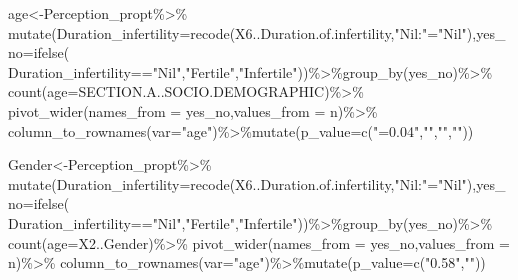 \documentclass[
]{article}
\newenvironment{Shaded}{\begin{snugshade}}{\end{snugshade}}
\newcommand{\AttributeTok}[1]{\textcolor[rgb]{0.77,0.63,0.00}{#1}}
\newcommand{\FunctionTok}[1]{\textcolor[rgb]{0.00,0.00,0.00}{#1}}
\newcommand{\NormalTok}[1]{#1}
\newcommand{\OtherTok}[1]{\textcolor[rgb]{0.56,0.35,0.01}{#1}}
\newcommand{\SpecialCharTok}[1]{\textcolor[rgb]{0.00,0.00,0.00}{#1}}
\newcommand{\StringTok}[1]{\textcolor[rgb]{0.31,0.60,0.02}{#1}}
\begin{document}
\begin{Shaded}
\begin{Highlighting}[]
\NormalTok{age}\OtherTok{\textless{}{-}}\NormalTok{Perception\_propt}\SpecialCharTok{\%\textgreater{}\%}
  \FunctionTok{mutate}\NormalTok{(}\AttributeTok{Duration\_infertility=}\FunctionTok{recode}\NormalTok{(X6..Duration.of.infertility,}\StringTok{"Nil:"}\OtherTok{=}\StringTok{"Nil"}\NormalTok{),}\AttributeTok{yes\_no=}\FunctionTok{ifelse}\NormalTok{(}
\NormalTok{   Duration\_infertility}\SpecialCharTok{==}\StringTok{"Nil"}\NormalTok{,}\StringTok{"Fertile"}\NormalTok{,}\StringTok{"Infertile"}\NormalTok{))}\SpecialCharTok{\%\textgreater{}\%}\FunctionTok{group\_by}\NormalTok{(yes\_no)}\SpecialCharTok{\%\textgreater{}\%}
  \FunctionTok{count}\NormalTok{(}\AttributeTok{age=}\NormalTok{SECTION.A..SOCIO.DEMOGRAPHIC)}\SpecialCharTok{\%\textgreater{}\%}
  \FunctionTok{pivot\_wider}\NormalTok{(}\AttributeTok{names\_from =}\NormalTok{ yes\_no,}\AttributeTok{values\_from =}\NormalTok{ n)}\SpecialCharTok{\%\textgreater{}\%}
  \FunctionTok{column\_to\_rownames}\NormalTok{(}\AttributeTok{var=}\StringTok{"age"}\NormalTok{)}\SpecialCharTok{\%\textgreater{}\%}\FunctionTok{mutate}\NormalTok{(}\AttributeTok{p\_value=}\FunctionTok{c}\NormalTok{(}\StringTok{"=0.04"}\NormalTok{,}\StringTok{""}\NormalTok{,}\StringTok{""}\NormalTok{,}\StringTok{""}\NormalTok{))}

\NormalTok{Gender}\OtherTok{\textless{}{-}}\NormalTok{Perception\_propt}\SpecialCharTok{\%\textgreater{}\%}
  \FunctionTok{mutate}\NormalTok{(}\AttributeTok{Duration\_infertility=}\FunctionTok{recode}\NormalTok{(X6..Duration.of.infertility,}\StringTok{"Nil:"}\OtherTok{=}\StringTok{"Nil"}\NormalTok{),}\AttributeTok{yes\_no=}\FunctionTok{ifelse}\NormalTok{(}
\NormalTok{ Duration\_infertility}\SpecialCharTok{==}\StringTok{"Nil"}\NormalTok{,}\StringTok{"Fertile"}\NormalTok{,}\StringTok{"Infertile"}\NormalTok{))}\SpecialCharTok{\%\textgreater{}\%}\FunctionTok{group\_by}\NormalTok{(yes\_no)}\SpecialCharTok{\%\textgreater{}\%}
  \FunctionTok{count}\NormalTok{(}\AttributeTok{age=}\NormalTok{X2..Gender)}\SpecialCharTok{\%\textgreater{}\%}
  \FunctionTok{pivot\_wider}\NormalTok{(}\AttributeTok{names\_from =}\NormalTok{ yes\_no,}\AttributeTok{values\_from =}\NormalTok{ n)}\SpecialCharTok{\%\textgreater{}\%}
  \FunctionTok{column\_to\_rownames}\NormalTok{(}\AttributeTok{var=}\StringTok{"age"}\NormalTok{)}\SpecialCharTok{\%\textgreater{}\%}\FunctionTok{mutate}\NormalTok{(}\AttributeTok{p\_value=}\FunctionTok{c}\NormalTok{(}\StringTok{"0.58"}\NormalTok{,}\StringTok{""}\NormalTok{))}


\end{Highlighting}
\end{Shaded}
\end{document}
